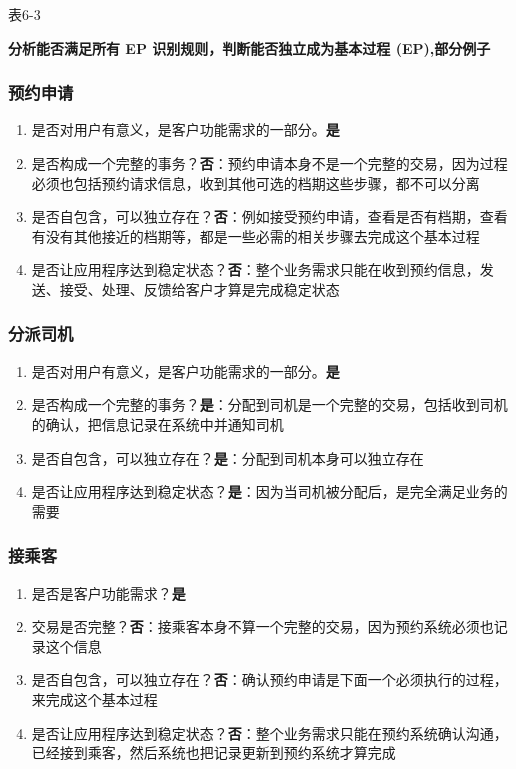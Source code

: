 表6-3

\textbf{分析能否满足所有 EP 识别规则，判断能否独立成为基本过程
(EP),部分例子}

\hypertarget{ux9884ux7ea6ux7533ux8bf7}{%
\subsubsection{预约申请}\label{ux9884ux7ea6ux7533ux8bf7}}

\begin{enumerate}
\tightlist
\item
  是否对用户有意义，是客户功能需求的一部分。\textbf{是}
\item
  是否构成一个完整的事务？\textbf{否}：预约申请本身不是一个完整的交易，因为过程必须也包括预约请求信息，收到其他可选的档期这些步骤，都不可以分离
\item
  是否自包含，可以独立存在？\textbf{否}：例如接受预约申请，查看是否有档期，查看有没有其他接近的档期等，都是一些必需的相关步骤去完成这个基本过程
\item
  是否让应用程序达到稳定状态？\textbf{否}：整个业务需求只能在收到预约信息，发送、接受、处理、反馈给客户才算是完成稳定状态
\end{enumerate}

\hypertarget{ux5206ux6d3eux53f8ux673a}{%
\subsubsection{分派司机}\label{ux5206ux6d3eux53f8ux673a}}

\begin{enumerate}
\tightlist
\item
  是否对用户有意义，是客户功能需求的一部分。\textbf{是}
\item
  是否构成一个完整的事务？\textbf{是}：分配到司机是一个完整的交易，包括收到司机的确认，把信息记录在系统中并通知司机
\item
  是否自包含，可以独立存在？\textbf{是}：分配到司机本身可以独立存在
\item
  是否让应用程序达到稳定状态？\textbf{是}：因为当司机被分配后，是完全满足业务的需要
\end{enumerate}

\hypertarget{ux63a5ux4e58ux5ba2}{%
\subsubsection{接乘客}\label{ux63a5ux4e58ux5ba2}}

\begin{enumerate}
\tightlist
\item
  是否是客户功能需求？\textbf{是}
\item
  交易是否完整？\textbf{否}：接乘客本身不算一个完整的交易，因为预约系统必须也记录这个信息
\item
  是否自包含，可以独立存在？\textbf{否}：确认预约申请是下面一个必须执行的过程，来完成这个基本过程
\item
  是否让应用程序达到稳定状态？\textbf{否}：整个业务需求只能在预约系统确认沟通，已经接到乘客，然后系统也把记录更新到预约系统才算完成
\end{enumerate}

